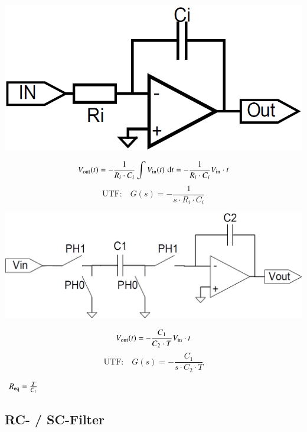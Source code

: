 \begin{minipage}[t]{0.55\columnwidth}
    \begin{center}
        \includegraphics[width=0.55\columnwidth]{images/rc_integrator.png}
    \end{center}
    $$ V_{\rm out}(t) = - \frac{1}{R_i \cdot C_i} \int V_{\rm in}(t) \, \mathop{} \! \mathrm{d} t = - \frac{1}{R_i \cdot C_i} V_{\rm in} \cdot t $$
    $$ \text{UTF:} \quad G(s) = - \frac{1}{s \cdot R_i \cdot C_i} $$
\end{minipage}
\hfill
\begin{minipage}[t]{0.42\columnwidth}
    \begin{center}
        \includegraphics[width=\columnwidth]{images/sc_integrator.png}
    \end{center}
    $$ V_{\rm out}(t) = - \frac{C_1}{C_2 \cdot T} V_{\rm in} \cdot t $$
    $$ \text{UTF:} \quad G(s) = - \frac{C_1}{s \cdot C_2 \cdot T} $$
    \begin{center}
        \textrightarrow\ $R_{\rm eq} = \frac{T}{C_1}$
    \end{center}
\end{minipage}


\subsection{RC- / SC-Filter}

